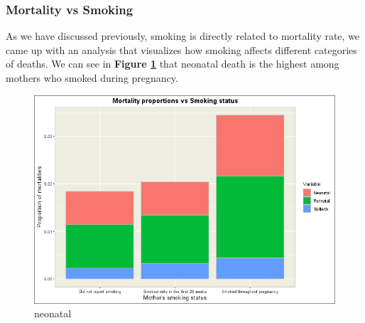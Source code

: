 \subsubsection{Mortality vs Smoking}
As we have discussed previously, smoking is directly related to mortality rate, we came up with an analysis that visualizes how smoking affects different categories of deaths.
We can see in \textbf{Figure \ref{fig:smoking-mortality}} that neonatal death is the highest among mothers who smoked during pregnancy.

\begin{figure}
  \centering
  \includegraphics[width=1\textwidth]{subsections/smoking/mortality_vs_smoking.png}
  \caption{neonatal}
  \label{fig:smoking-mortality}
\end{figure}